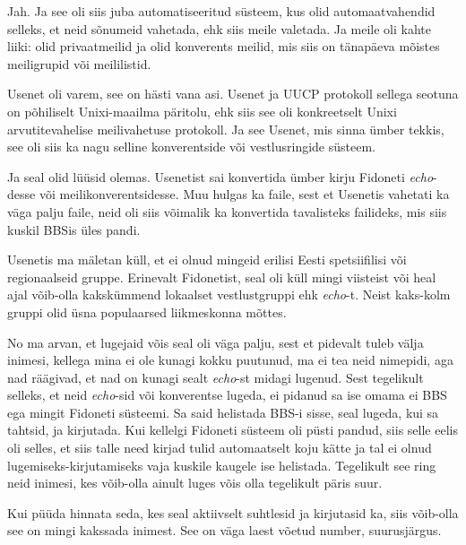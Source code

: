 Jah. Ja see oli siis juba automatiseeritud süsteem, kus olid automaatvahendid selleks, et neid sõnumeid vahetada, ehk siis meile valetada. Ja meile oli kahte liiki: olid privaatmeilid ja olid konverents meilid, mis siis on tänapäeva mõistes meiligrupid või meililistid.


Usenet oli varem, see on hästi vana asi. Usenet ja UUCP protokoll sellega seotuna on põhiliselt  Unixi-maailma päritolu, ehk siis see oli konkreetselt Unixi arvutitevahelise meilivahetuse protokoll. Ja see Usenet, mis  sinna ümber tekkis,  see oli siis ka nagu selline konverentside või vestlusringide süsteem.


Ja seal olid lüüsid olemas. Usenetist sai konvertida ümber kirju Fidoneti \emph{echo}-desse või meilikonverentsidesse. Muu hulgas ka faile, sest et Usenetis vahetati ka väga palju faile,  neid oli siis võimalik ka konvertida tavalisteks failideks, mis siis kuskil BBSis üles pandi.


Usenetis ma mäletan küll, et ei olnud mingeid erilisi Eesti spetsiifilisi või regionaalseid gruppe. Erinevalt Fidonetist, seal oli küll mingi viisteist või heal ajal võib-olla kakskümmend lokaalset  vestlustgruppi ehk \emph{echo}-t. Neist kaks-kolm gruppi olid üsna populaarsed liikmeskonna mõttes.


No ma arvan, et lugejaid võis seal oli väga palju, sest et pidevalt tuleb välja inimesi, kellega mina ei ole kunagi kokku puutunud, ma ei tea neid nimepidi, aga nad räägivad, et nad on kunagi sealt \emph{echo}-st  midagi lugenud. Sest tegelikult selleks, et neid \emph{echo}-sid või konverentse lugeda,  ei pidanud sa ise omama ei BBS ega mingit Fidoneti süsteemi. Sa said helistada BBS-i sisse, seal lugeda, kui sa tahtsid, ja kirjutada. Kui kellelgi Fidoneti süsteem oli püsti pandud, siis selle eelis oli selles, et siis talle need kirjad tulid automaatselt koju kätte ja tal ei olnud lugemiseks-kirjutamiseks vaja kuskile kaugele ise helistada. Tegelikult see ring  neid inimesi, kes võib-olla ainult luges võis olla tegelikult päris suur. 

Kui püüda hinnata seda, kes seal aktiivselt suhtlesid ja kirjutasid ka, siis  võib-olla see on mingi kakssada inimest. See on väga laest võetud number, suurusjärgus.

